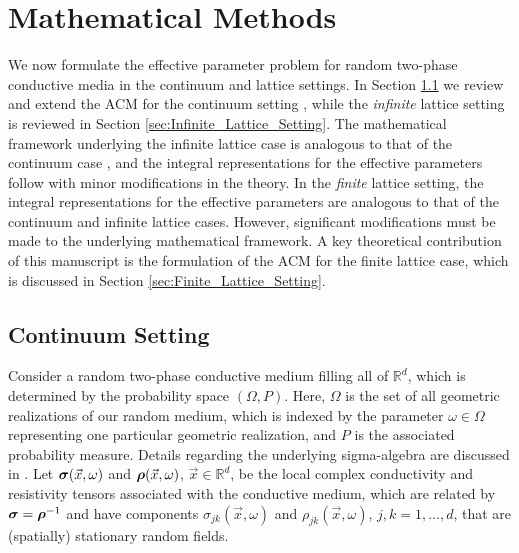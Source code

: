 \documentclass{cmslatex}
\newcommand\bsig{\mbox{\boldmath${\sigma}$}}
\newcommand\brho{\mbox{\boldmath${\rho}$}}
\begin{document}
    

\section{Mathematical Methods}\label{sec:Mathematical_Methods} 
%
We now formulate the effective parameter problem for random
two-phase conductive media in the continuum and lattice
settings. In Section \ref{sec:Continuum_Setting} we review and extend
the ACM for the continuum setting \cite{Golden:CMP-473}, while the
\emph{infinite} 
lattice setting \cite{Bruno:JSP-365,Golden:CMP-467} is reviewed in
Section \ref{sec:Infinite_Lattice_Setting}. The mathematical framework
underlying the infinite lattice case is analogous to that of
the continuum case \cite{Bruno:JSP-365}, and the integral
representations for the effective parameters follow with minor
modifications in the theory. In the \emph{finite} lattice setting, the
integral representations for the effective parameters are analogous to
that of the continuum and infinite lattice cases. However,
significant modifications must be made to the underlying mathematical
framework. A key theoretical contribution of this manuscript is the
formulation of the ACM for the finite lattice case, which is discussed
in Section \ref{sec:Finite_Lattice_Setting}.  


\subsection{Continuum Setting}\label{sec:Continuum_Setting}
%
Consider a random two-phase conductive medium filling all of
$\mathbb{R}^d$, which is determined by the probability space
$(\Omega,P)$. Here, $\Omega$ is the set of all  geometric realizations of our
random medium, which is indexed by the parameter $\omega\in\Omega$ representing
one particular geometric realization, and $P$ is the associated
probability measure. Details regarding the underlying sigma-algebra
are discussed in \cite{Papanicolaou:RF-835}. Let $\bsig(\vec{x},\omega)$
and $\brho(\vec{x},\omega)$, $\vec{x}\in\mathbb{R}^d$, be the local complex
conductivity and resistivity tensors associated with the conductive
medium, which are related by $\bsig=\brho^{-1}$ and have components
$\sigma_{jk}(\vec{x},\omega)$ and $\rho_{jk}(\vec{x},\omega)$, $j,k=1,\ldots,d$, that are
(spatially) stationary random fields. 
\end{document}
